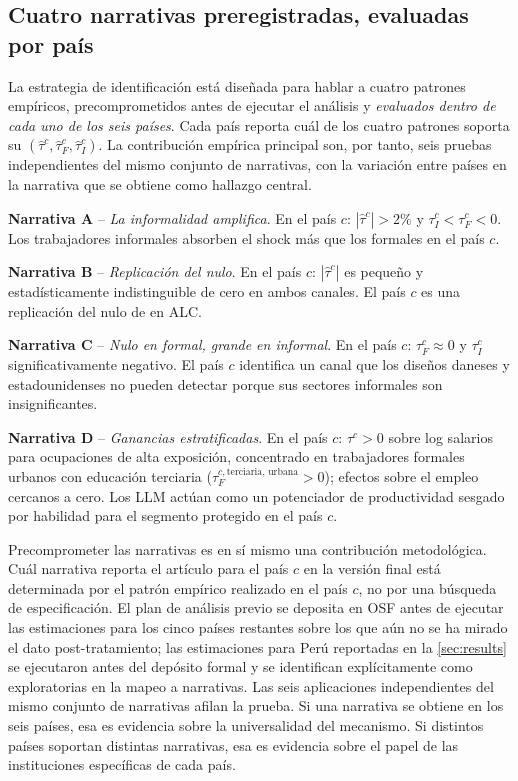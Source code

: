 \subsection{Cuatro narrativas preregistradas, evaluadas por país}
\label{subsec:method_narratives}

La estrategia de identificación está diseñada para hablar a cuatro patrones empíricos, precomprometidos antes de ejecutar el análisis y \emph{evaluados dentro de cada uno de los seis países}. Cada país reporta cuál de los cuatro patrones soporta su $(\hat\tau^c, \hat\tau_F^c, \hat\tau_I^c)$. La contribución empírica principal son, por tanto, seis pruebas independientes del mismo conjunto de narrativas, con la variación entre países en la narrativa que se obtiene como hallazgo central.

\textbf{Narrativa A} -- \emph{La informalidad amplifica}. En el país $c$: $|\hat\tau^c| > 2\%$ y $\tau_I^c < \tau_F^c < 0$. Los trabajadores informales absorben el shock más que los formales en el país $c$.

\textbf{Narrativa B} -- \emph{Replicación del nulo}. En el país $c$: $|\hat\tau^c|$ es pequeño y estadísticamente indistinguible de cero en ambos canales. El país $c$ es una replicación del nulo de \citet{HumlumVestergaard2025_llm} en ALC.

\textbf{Narrativa C} -- \emph{Nulo en formal, grande en informal}. En el país $c$: $\tau_F^c \approx 0$ y $\tau_I^c$ significativamente negativo. El país $c$ identifica un canal que los diseños daneses y estadounidenses no pueden detectar porque sus sectores informales son insignificantes.

\textbf{Narrativa D} -- \emph{Ganancias estratificadas}. En el país $c$: $\tau^c > 0$ sobre log salarios para ocupaciones de alta exposición, concentrado en trabajadores formales urbanos con educación terciaria ($\tau_F^{c,\text{terciaria, urbana}} > 0$); efectos sobre el empleo cercanos a cero. Los LLM actúan como un potenciador de productividad sesgado por habilidad para el segmento protegido en el país $c$.

Precomprometer las narrativas es en sí mismo una contribución metodológica. Cuál narrativa reporta el artículo para el país $c$ en la versión final está determinada por el patrón empírico realizado en el país $c$, no por una búsqueda de especificación. El plan de análisis previo se deposita en OSF antes de ejecutar las estimaciones para los cinco países restantes sobre los que aún no se ha mirado el dato post-tratamiento; las estimaciones para Perú reportadas en la \cref{sec:results} se ejecutaron antes del depósito formal y se identifican explícitamente como exploratorias en la mapeo a narrativas. Las seis aplicaciones independientes del mismo conjunto de narrativas afilan la prueba. Si una narrativa se obtiene en los seis países, esa es evidencia sobre la universalidad del mecanismo. Si distintos países soportan distintas narrativas, esa es evidencia sobre el papel de las instituciones específicas de cada país.
